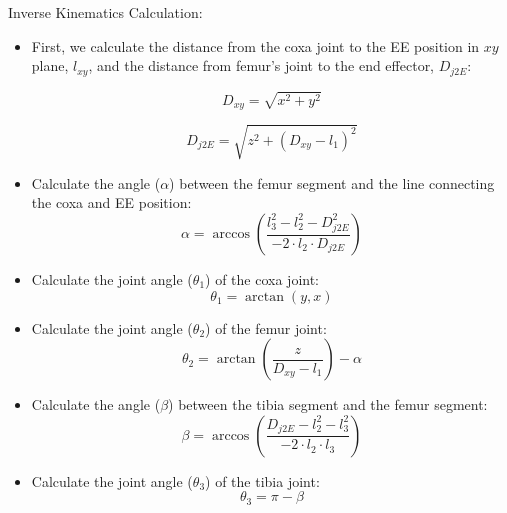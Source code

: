 Inverse Kinematics Calculation:
    \begin{itemize}
      \item First, we calculate the distance from the coxa joint to the EE position in $xy$ plane, $l_{xy}$, and the distance from femur's joint to the end effector, $D_{j2E}$:
    
      \begin{equation} \label{l_xy}
        D_{xy} = \sqrt{x^2 + y^2}
      \end{equation}
      
      \begin{equation} \label{D_j2E}
        D_{j2E} = \sqrt{z^2 + (D_{xy} - l_1)^2}
      \end{equation}
      
      \item Calculate the angle ($\alpha$) between the femur segment and the line connecting the coxa and EE position:
      \begin{equation}
        \alpha = \arccos\left(\frac{l_3^2 - l_2^2 - D_{j2E}^2}{-2 \cdot l_2 \cdot D_{j2E}}\right)
      \end{equation}
      
      \item Calculate the joint angle ($\theta_1$) of the coxa joint:
      \begin{equation}
        \theta_1 = \arctan(y, x)
      \end{equation}
      
      \item Calculate the joint angle ($\theta_2$) of the femur joint:
      \begin{equation}
        \theta_2 = \arctan\left(\frac{z}{D_{xy} - l_1}\right) - \alpha
      \end{equation}
      
      \item Calculate the angle ($\beta$) between the tibia segment and the femur segment:
      \begin{equation}
        \beta = \arccos\left(\frac{D_{j2E} - l_2^2 - l_3^2}{-2 \cdot l_2 \cdot l_3}\right)
      \end{equation}
      
      \item Calculate the joint angle ($\theta_3$) of the tibia joint:
      \begin{equation}
        \theta_3 = \pi - \beta
      \end{equation}
    \end{itemize}
  
